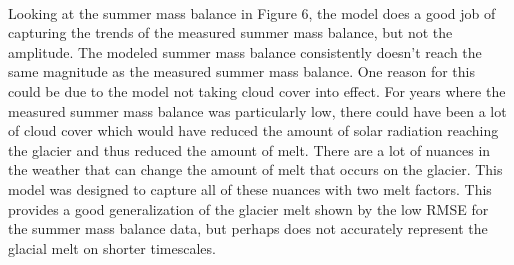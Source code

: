 \documentclass{article}
\begin{document}
\paragraph{}
Looking at the summer mass balance in Figure 6, the model does a good job of capturing the trends of the measured summer mass balance, but not 
the amplitude. The modeled summer mass balance consistently doesn't reach the same magnitude as the measured summer mass balance. One reason for this 
could be due to the model not taking cloud cover into effect. For years where the measured summer mass balance was particularly low, there could 
have been a lot of cloud cover which would have reduced the amount of solar radiation reaching the glacier and thus reduced the amount of melt. 
There are a lot of nuances in the weather that can change the amount of melt that occurs on the glacier. This model was designed to capture all of 
these nuances with two melt factors. This provides a good generalization of the glacier melt shown by the low RMSE for the summer mass balance data, 
but perhaps does not accurately represent the glacial melt on shorter timescales.
\end{document}
